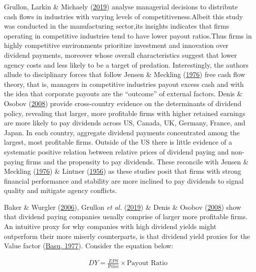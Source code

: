 \documentclass[11pt,preprint, authoryear]{elsarticle}
\numberwithin{equation}{section}
\numberwithin{figure}{section}
\numberwithin{table}{section}
\begin{document}
Grullon, Larkin \& Michaely
(\protect\hyperlink{ref-grullon2019dividend}{2019}) analyse managerial
decisions to distribute cash flows in industries with varying levels of
competitiveness.Albeit this study was conducted in the manufacturing
sector,its insights indicates that firms operating in competitive
industries tend to have lower payout ratios.Thus firms in highly
competitive environments prioritize investment and innovation over
dividend payments, moreover whose overall characteristics suggest that
lower agency costs and less likely to be a target of predation.
Interestingly, the authors allude to disciplinary forces that follow
Jensen \& Meckling (\protect\hyperlink{ref-jensen1976theory}{1976}) free
cash flow theory, that is, managers in competitive industries payout
excess cash and with the idea that corporate payouts are the ``outcome''
of external factors. Denis \& Osobov
(\protect\hyperlink{ref-denis2008firms}{2008}) provide cross-country
evidence on the determinants of dividend policy, revealing that larger,
more profitable firms with higher retained earnings are more likely to
pay dividends across US, Canada, UK, Germany, France, and Japan. In each
country, aggregate dividend payments concentrated among the largest,
most profitable firms. Outside of the US there is little evidence of a
systematic positive relation between relative prices of dividend paying
and non-paying firms and the propensity to pay dividends. These
reconcile with Jensen \& Meckling
(\protect\hyperlink{ref-jensen1976theory}{1976}) \& Lintner
(\protect\hyperlink{ref-lintner1956distribution}{1956}) as these studies
posit that firms with strong financial performance and stability are
more inclined to pay dividends to signal quality and mitigate agency
conflicts.

Baker \& Wurgler (\protect\hyperlink{ref-baker2006investor}{2006}),
Grullon \emph{et al.}
(\protect\hyperlink{ref-grullon2019dividend}{2019}) \& Denis \& Osobov
(\protect\hyperlink{ref-denis2008firms}{2008}) show that dividend paying
companies usually comprise of larger more profitable firms. An intuitive
proxy for why companies with high dividend yields might outperform their
more miserly counterparts, is that dividend yield proxies for the Value
factor (\protect\hyperlink{ref-basu1977investment}{Basu, 1977}).
Consider the equation below:

\begin{align*}
DY = \frac{EPS}{\text{Price}} \times \text{Payout Ratio}
\end{align*}
\end{document}
